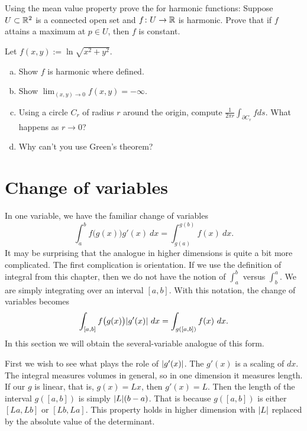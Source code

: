 \begin{exercise}
Using the mean value property prove the \emph{} for harmonic
functions:
Suppose $U \subset {\mathbb{R}}^2$ is a connected open set and
$f \colon U \to {\mathbb{R}}$ is harmonic. Prove that
if $f$ attains a maximum at $p \in U$, then $f$ is constant.
\end{exercise}

\begin{exercise}
Let $f(x,y) := \ln \sqrt{x^2+y^2}$.
\begin{enumerate}[a)]
\item
Show $f$ is harmonic where defined.
\item
Show $\lim_{(x,y) \to 0} f(x,y) = -\infty$.
\item
Using a circle $C_r$ of radius
$r$ around the origin, compute $\frac{1}{2\pi r} \int_{\partial C_r} f ds$.
What happens as $r \to 0$?
\item
Why can't you use Green's theorem?
\end{enumerate}
\end{exercise}



\sectionnewpage
\section{Change of variables}
\label{sec:mvchangeofvars}


In one variable, we have the familiar change of variables
\begin{equation*}
\int_a^b f\bigl(g(x)\bigr) g'(x)~ dx = 
\int_{g(a)}^{g(b)} f(x) ~ dx .
\end{equation*}
It may be surprising that the analogue in higher dimensions is quite
a bit more complicated.  The first complication is orientation.  If we use
the definition of integral from this chapter, then we do not have the notion
of $\int_a^b$ versus $\int_b^a$.  We are simply integrating over an
interval $[a,b]$.  With this notation, the change of variables becomes
\begin{equation*}
\int_{[a,b]} f\bigl(g(x)\bigr) \lvert {g'(x)} \rvert~ dx = 
\int_{g([a,b])} f(x) ~ dx .
\end{equation*}
In this section we will obtain the several-variable analogue of this form.

First we wish to see what plays the role of $\lvert {g'(x)} \rvert$.  
The $g'(x)$ is a scaling of $dx$.  The integral measures volumes in general, so in one
dimension it measures length.  If our $g$ is linear, that is, $g(x)=Lx$, then
$g'(x) = L$.  Then the length of the interval $g([a,b])$ is simply
$\lvert {L} \rvert(b-a)$.  That is because $g([a,b])$ is either $[La,Lb]$ or
$[Lb,La]$.  This property holds in higher dimension with $\lvert {L} \rvert$ replaced
by the absolute value of the determinant.

